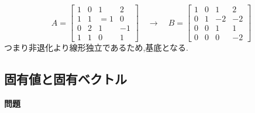 \[
A=\begin{bmatrix}
    1 & 0 & 1 & 2 \\ 1 & 1 & =1 & 0 \\ 0 & 2 & 1 & -1 \\ 1 & 1 & 0 & 1\end{bmatrix}
    \quad \rightarrow \quad    
B=\begin{bmatrix}
    1 & 0 & 1 & 2 \\ 0 & 1 & -2 & -2 \\ 0 & 0 & 1 & 1 \\ 0 & 0 & 0 & -2
\end{bmatrix}\]
つまり非退化より線形独立であるため,基底となる.
\subsection{固有値と固有ベクトル}
\noindent
\textbf{問題}\\

